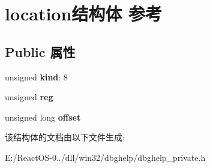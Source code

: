 \hypertarget{structlocation}{}\section{location结构体 参考}
\label{structlocation}
\subsection*{Public 属性}
\begin{DoxyCompactItemize}
\item 
\mbox{\label{structlocation_abca317f3db3db8286183bdeba4f65d0b}} 
unsigned {\bfseries kind}\+: 8
\item 
\mbox{\label{structlocation_a5b731be938767706f0771f4a7b42e06d}} 
unsigned {\bfseries reg}
\item 
\mbox{\label{structlocation_aeb9df8b067cc243fefdbb1c7e20ced6e}} 
unsigned long {\bfseries offset}
\end{DoxyCompactItemize}


该结构体的文档由以下文件生成\+:\begin{DoxyCompactItemize}
\item 
E\+:/\+React\+O\+S-\/0../dll/win32/dbghelp/dbghelp\+\_\+private.\+h\end{DoxyCompactItemize}
